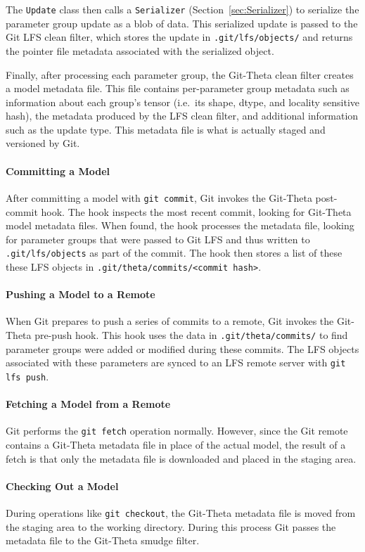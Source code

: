 \documentclass[nohyperref]{article}
\def\code#1{\texttt{#1}}
\theoremstyle{plain}
\theoremstyle{definition}
\theoremstyle{remark}
\begin{document}
The \code{Update} class then  calls a \code{Serializer} (Section~\ref{sec:Serializer}) to serialize the parameter group update as a blob of data. This serialized update is passed to the Git LFS clean filter, which stores the update in \code{.git/lfs/objects/} and returns the pointer file metadata associated with the serialized object.

Finally, after processing each parameter group, the Git-Theta clean filter creates a model metadata file. This file contains per-parameter group metadata such as information about each group's tensor (i.e.\ its shape, dtype, and locality sensitive hash), the metadata produced by the LFS clean filter, and additional information such as the update type. This metadata file is what is actually staged and versioned by Git.

\paragraph{Committing a Model}
After committing a model with \code{git commit}, Git invokes the Git-Theta post-commit hook. The hook inspects the most recent commit, looking for Git-Theta model metadata files. When found, the hook processes the metadata file, looking for parameter groups that were passed to Git LFS and thus written to \code{.git/lfs/objects} as part of the commit. The hook then stores a list of these these LFS objects in \code{.git/theta/commits/<commit\ hash>}.

\paragraph{Pushing a Model to a Remote}
When Git prepares to push a series of commits to a remote, Git invokes the Git-Theta pre-push hook. This hook uses the data in \code{.git/theta/commits/} to find parameter groups were added or modified during these commits. The LFS objects associated with these parameters are synced to an LFS remote server with \code{git lfs push}.

\paragraph{Fetching a Model from a Remote}
Git performs the \code{git fetch} operation normally. However, since the Git remote contains a Git-Theta metadata file in place of the actual model, the result of a fetch is that only the metadata file is downloaded and placed in the staging area.

\paragraph{Checking Out a Model}
During operations like \code{git checkout}, the Git-Theta metadata file is moved from the staging area to the working directory. During this process Git passes the metadata file to the Git-Theta smudge filter. 
\end{document}
